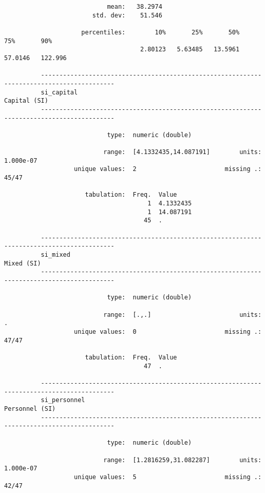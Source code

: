 \documentclass{article}
\begin{document}
\begin{verbatim}
                            mean:   38.2974
                        std. dev:    51.546
          
                     percentiles:        10%       25%       50%       75%       90%
                                     2.80123   5.63485   13.5961   57.0146   122.996
          
          ------------------------------------------------------------------------------------------
          si_capital                                                                    Capital (SI)
          ------------------------------------------------------------------------------------------
          
                            type:  numeric (double)
          
                           range:  [4.1332435,14.087191]        units:  1.000e-07
                   unique values:  2                        missing .:  45/47
          
                      tabulation:  Freq.  Value
                                       1  4.1332435
                                       1  14.087191
                                      45  .
          
          ------------------------------------------------------------------------------------------
          si_mixed                                                                        Mixed (SI)
          ------------------------------------------------------------------------------------------
          
                            type:  numeric (double)
          
                           range:  [.,.]                        units:  .
                   unique values:  0                        missing .:  47/47
          
                      tabulation:  Freq.  Value
                                      47  .
          
          ------------------------------------------------------------------------------------------
          si_personnel                                                                Personnel (SI)
          ------------------------------------------------------------------------------------------
          
                            type:  numeric (double)
          
                           range:  [1.2816259,31.082287]        units:  1.000e-07
                   unique values:  5                        missing .:  42/47
          

\end{verbatim}
\end{document}
